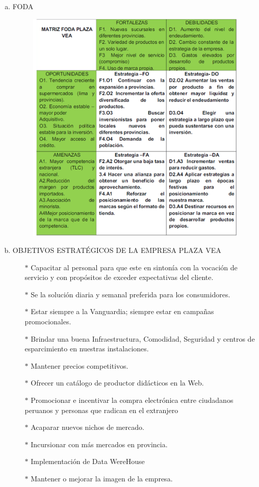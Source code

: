 \begin{enumerate}[a)]
	\item FODA

			\begin{figure}[htb]
				\begin{center}
					\includegraphics[width=15cm]{./Imagenes/7}
				\end{center}
			\end{figure}

	\item OBJETIVOS ESTRATÉGICOS DE LA EMPRESA PLAZA VEA

		\begin{itemize}
  		  \item[$*$] Capacitar al personal para que este en sintonía con la vocación de servicio y con propósitos de exceder expectativas del cliente.
		\item[$*$] Se la solución diaria y semanal preferida para los consumidores.
		\item[$*$ ]Estar siempre a la Vanguardia; siempre estar en campañas promocionales.
		\item[$*$] Brindar una buena Infraestructura, Comodidad, Seguridad y centros de esparcimiento en nuestras instalaciones.

		\item[$*$] Mantener precios competitivos.
		\item[$*$] Ofrecer un catálogo de productor didácticos en la Web.
		\item[$*$] Promocionar e incentivar la compra electrónica entre ciudadanos peruanos y personas que radican en el extranjero
		\item[$*$] Acaparar nuevos nichos de mercado.
		\item[$*$] Incursionar con más mercados en provincia.
		\item[$*$] Implementación de Data WereHouse
		\item[$*$] Mantener o mejorar la imagen de la empresa.



\end{itemize}
\end{enumerate}
